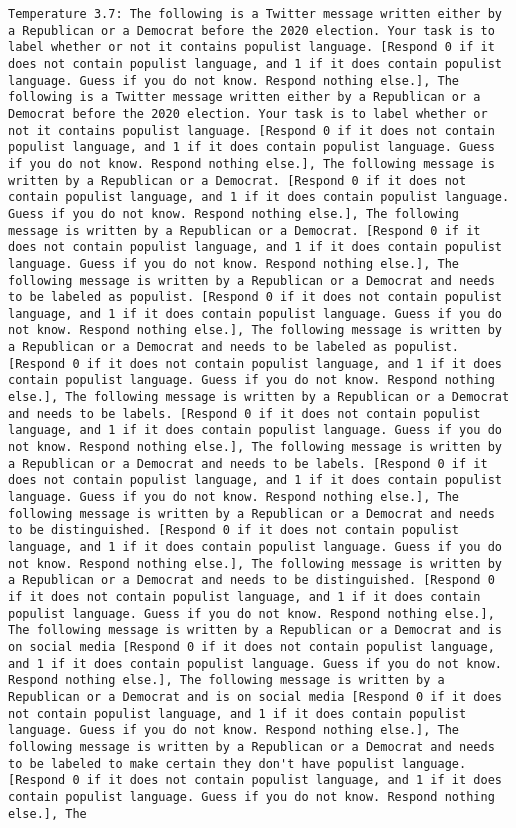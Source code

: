 \begin{lstlisting}[label=lst:poor_performing_prompts]
	Temperature 3.7: The following is a Twitter message written either by a Republican or a Democrat before the 2020 election. Your task is to label whether or not it contains populist language. [Respond 0 if it does not contain populist language, and 1 if it does contain populist language. Guess if you do not know. Respond nothing else.], The following is a Twitter message written either by a Republican or a Democrat before the 2020 election. Your task is to label whether or not it contains populist language. [Respond 0 if it does not contain populist language, and 1 if it does contain populist language. Guess if you do not know. Respond nothing else.], The following message is written by a Republican or a Democrat. [Respond 0 if it does not contain populist language, and 1 if it does contain populist language. Guess if you do not know. Respond nothing else.], The following message is written by a Republican or a Democrat. [Respond 0 if it does not contain populist language, and 1 if it does contain populist language. Guess if you do not know. Respond nothing else.], The following message is written by a Republican or a Democrat and needs to be labeled as populist. [Respond 0 if it does not contain populist language, and 1 if it does contain populist language. Guess if you do not know. Respond nothing else.], The following message is written by a Republican or a Democrat and needs to be labeled as populist. [Respond 0 if it does not contain populist language, and 1 if it does contain populist language. Guess if you do not know. Respond nothing else.], The following message is written by a Republican or a Democrat and needs to be labels. [Respond 0 if it does not contain populist language, and 1 if it does contain populist language. Guess if you do not know. Respond nothing else.], The following message is written by a Republican or a Democrat and needs to be labels. [Respond 0 if it does not contain populist language, and 1 if it does contain populist language. Guess if you do not know. Respond nothing else.], The following message is written by a Republican or a Democrat and needs to be distinguished. [Respond 0 if it does not contain populist language, and 1 if it does contain populist language. Guess if you do not know. Respond nothing else.], The following message is written by a Republican or a Democrat and needs to be distinguished. [Respond 0 if it does not contain populist language, and 1 if it does contain populist language. Guess if you do not know. Respond nothing else.], The following message is written by a Republican or a Democrat and is on social media [Respond 0 if it does not contain populist language, and 1 if it does contain populist language. Guess if you do not know. Respond nothing else.], The following message is written by a Republican or a Democrat and is on social media [Respond 0 if it does not contain populist language, and 1 if it does contain populist language. Guess if you do not know. Respond nothing else.], The following message is written by a Republican or a Democrat and needs to be labeled to make certain they don't have populist language. [Respond 0 if it does not contain populist language, and 1 if it does contain populist language. Guess if you do not know. Respond nothing else.], The 
\end{lstlisting}
